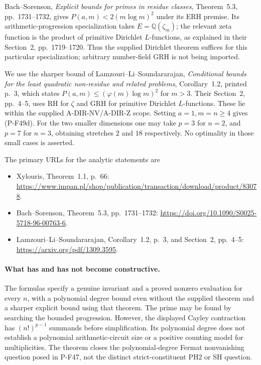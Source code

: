 Bach--Sorenson, \emph{Explicit bounds for primes in
residue classes}, Theorem~5.3, pp.~1731--1732, gives
$P(a,m)<2(m\log m)^2$ under its ERH premise. Its
arithmetic-progression specialization takes
$E=\mathbb Q(\zeta_m)$; the relevant zeta function is
the product of primitive Dirichlet $L$-functions, as
explained in their Section~2, pp.~1719--1720.
Thus the supplied Dirichlet theorem suffices for this
particular specialization; arbitrary number-field
GRH is not being imported.

We use the sharper bound of Lamzouri--Li--Soundararajan,
\emph{Conditional bounds for the least quadratic
non-residue and related problems}, Corollary~1.2,
printed p.~3, which states
$P(a,m)\le(\varphi(m)\log m)^2$ for $m>3$.
Their Section~2, pp.~4--5, uses RH for $\zeta$ and
GRH for primitive Dirichlet $L$-functions. These lie
within the supplied A-DIR-NV/A-DIR-Z scope. Setting
$a=1,m=n\ge4$ gives (P-F49d). For the two smaller
dimensions one may take $p=3$ for $n=2$, and $p=7$
for $n=3$, obtaining stretches $2$ and $18$ respectively.
No optimality in those small cases is asserted.

The primary URLs for the analytic statements are
\begin{itemize}
\item Xylouris, Theorem~1.1, p.~66:
\url{https://www.impan.pl/shop/publication/transaction/download/product/83078}.
\item Bach--Sorenson, Theorem~5.3, pp.~1731--1732:
\url{https://doi.org/10.1090/S0025-5718-96-00763-6}.
\item Lamzouri--Li--Soundararajan, Corollary~1.2,
p.~3, and Section~2, pp.~4--5:
\url{https://arxiv.org/pdf/1309.3595}.
\end{itemize}

\paragraph{What has and has not become constructive.}
The formulas specify a genuine invariant and a proved
nonzero evaluation for every $n$, with a polynomial
degree bound even without the supplied theorem and a
sharper explicit bound using that theorem. The prime
may be found by searching the bounded progression.
However, the displayed Cayley contraction has
$(n!)^{p-1}$ summands before simplification. Its polynomial
degree does not establish a polynomial arithmetic-circuit
size or a positive counting model for multiplicities.
The theorem closes the polynomial-degree Fermat
nonvanishing question posed in P-F47, not the distinct
strict-constituent PH2 or SH question.
